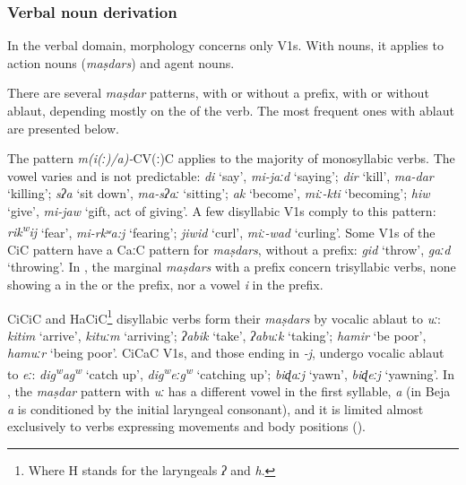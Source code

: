 \documentclass[output=paper]{langsci/langscibook}
\begin{document}
 \subsubsection{Verbal noun derivation}

In the verbal domain,  morphology concerns only V1s. With nouns, it applies to action nouns (\textit{maṣdars}) and agent nouns.

There are several \textit{maṣdar} patterns, with or without a prefix, with or without ablaut, depending mostly on the  of the verb. The most frequent ones with ablaut are presented below.

The pattern \textit{m(i(ː)/a)-}CV(ː)C applies to the majority of monosyllabic verbs. The  vowel varies and is not predictable: \textit{di} ‘say’, \textit{mi-jaːd} ‘saying’; \textit{dir} ‘kill’, \textit{ma-dar} ‘killing’; \textit{sʔa} ‘sit down’, \textit{ma\nobreakdash-sʔaː} ‘sitting’; \textit{ak} ‘become’, \textit{miː-kti} ‘becoming’; \textit{hiw} ‘give’, \textit{mi-jaw} ‘gift, act of giving’. A few disyllabic V1s comply to this pattern: \textit{rik\textsuperscript{w}}\textit{ij} ‘fear’, \textit{mi-rkʷa:j} ‘fearing’; \textit{jiwid} ‘curl’, \textit{miː-wad} ‘curling’. Some V1s of the CiC pattern have a CaːC pattern for \textit{maṣdars}, without a prefix: \textit{gid} ‘throw’, \textit{gaːd} ‘throwing’. In  , the marginal \textit{maṣdars} with a prefix concern trisyllabic verbs, none showing a  in the  or the prefix, nor a vowel \textit{i} in the prefix.

CiCiC and HaCiC\footnote{Where H stands for the laryngeals \textit{ʔ} and \textit{h}.} disyllabic verbs form their \textit{maṣdars} by vocalic ablaut to \textit{uː}: \textit{kitim} ‘arrive’, \textit{kituːm} ‘arriving’; \textit{ʔabik} ‘take’, \textit{ʔabuːk} ‘taking’; \textit{hamir} ‘be poor’, \textit{hamuːr} ‘being poor’. CiCaC V1s, and those ending in \textit{{}-j}, undergo vocalic ablaut to \textit{eː}: \textit{dig\textsuperscript{w}}\textit{ag\textsuperscript{w}} ‘catch up’, \textit{dig\textsuperscript{w}}\textit{eːg\textsuperscript{w}} ‘catching up’; \textit{biɖaːj} ‘yawn’, \textit{biɖeːj} ‘yawning’. In  , the \textit{maṣdar} pattern with \textit{uː} has a different vowel in the first syllable, \textit{a} (in Beja \textit{a} is conditioned by the initial laryngeal consonant), and it is limited almost exclusively to verbs expressing movements and body positions (\citealt[81]{BlachèreGaudefroy-Demombynes1975}). 
\end{document}
